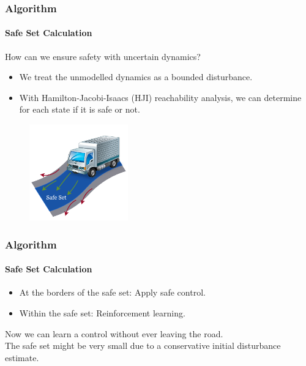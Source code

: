 \documentclass[t]{beamer}
\begin{document}
\begin{frame}
\frametitle{Algorithm}
\framesubtitle{Safe Set Calculation}
How can we ensure safety with uncertain dynamics?
\begin{itemize}
\item We treat the unmodelled dynamics as a bounded disturbance.

\item With Hamilton-Jacobi-Isaacs (HJI) reachability analysis, we can determine for each state if it is safe or not.
\end{itemize}

\begin{figure}
\vspace{-0.6cm}
\includegraphics[clip, trim=3mm 3mm 4mm 10mm, width=0.38\textwidth]{SafeStreet}
\end{figure}

\end{frame}

\begin{frame}
\frametitle{Algorithm}
\framesubtitle{Safe Set Calculation}
\begin{itemize}
\item At the borders of the safe set: Apply safe control.
\item Within the safe set: Reinforcement learning.
\end{itemize}
\vspace{1cm}
 Now we can learn a control without ever leaving the road.\\
 The safe set might be very small due to a conservative initial disturbance estimate.
\end{frame}
\end{document}
